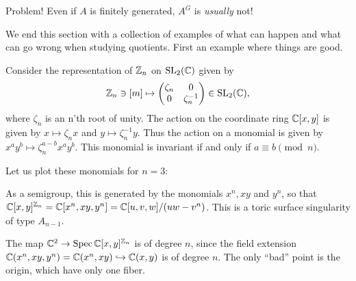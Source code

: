 \documentclass[11pt, english]{article}
\begin{document}
Problem! Even if $A$ is finitely generated, $A^G$ is \emph{usually} not!

We end this section with a collection of examples of what can happen and what can go wrong when studying quotients. First an example where things are good.

\begin{example}
Consider the representation of $\mathbb{Z}_n$ on $\operatorname{SL}_2(\mathbb{C})$ given by
$$
\mathbb{Z}_n \ni [m] \mapsto 
\begin{pmatrix}
  \zeta_n & 0 \\ 0 & \zeta_n^{-1}
\end{pmatrix} \in \operatorname{SL}_2(\mathbb{C}),
$$
where $\zeta_n$ is an n'th root of unity. The action on the coordinate ring $\mathbb{C}[x,y]$ is given by $x \mapsto \zeta_n x$ and $y \mapsto \zeta_n^{-1}y$. Thus the action on a monomial is given by $x^ay^b \mapsto \zeta_n^{a-b}x^a y^b$. This monomial is invariant if and only if $a \equiv b \pmod{n}$.

Let us plot these monomials for $n=3$: 
\begin{center}
\end{center}

As a semigroup, this is generated by the monomials $x^n,xy$ and $y^n$, so that $\mathbb{C}[x,y]^{\mathbb{Z}_n}=\mathbb{C}[x^n,xy,y^n]=\mathbb{C}[u,v,w]/(uw-v^n)$. This is a toric surface singularity of type $A_{n-1}$.

The  map $\mathbb{C}^2 \to \operatorname{Spec} \mathbb{C}[x,y]^{\mathbb{Z}_n}$ is of degree $n$, since the field extension $\mathbb{C}(x^n,xy,y^n)=\mathbb{C}(x^n,xy) \hookrightarrow \mathbb{C}(x,y)$ is of degree $n$. The only ``bad'' point is the origin, which have only one fiber.
\end{example}
\end{document}
